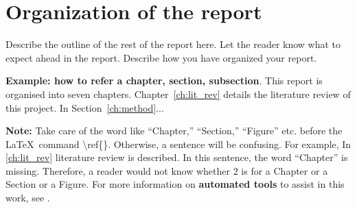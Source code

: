  



\section*{Organization of the report} %
\label{sec:intro_org} %
Describe the outline of the rest of the report here. Let the reader know what to expect ahead in the report. Describe how you have organized your report. 

\textbf{Example: how to refer a chapter, section, subsection}. This report is organised into seven chapters. Chapter~\ref{ch:lit_rev} details the literature review of this project. In Section~\ref{ch:method}...  %

\textbf{Note:}  Take care of the word like ``Chapter,'' ``Section,'' ``Figure'' etc. before the \LaTeX~command \textbackslash ref\{\}. Otherwise, a  sentence will be confusing. For example, In \ref{ch:lit_rev} literature review is described. In this sentence, the word ``Chapter'' is missing. Therefore, a reader would not know whether 2 is for a Chapter or a Section or a Figure.  For more information on \textbf{automated tools} to assist in this work, see .

